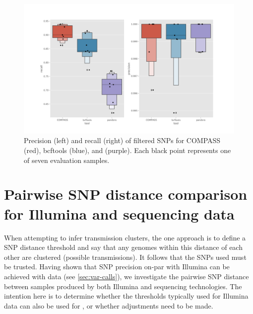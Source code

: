 \begin{figure}
\begin{center}
\includegraphics[width=0.9\columnwidth]{Chapter2/Figs/combined-precision-recall-filters-snps.png}
\caption{{Precision (left) and recall (right) of filtered SNPs for COMPASS (red), bcftools (blue), and \pandora{} (purple). Each black point represents one of seven evaluation samples. 
{\label{fig:prec-recall-filters}}%
}}
\end{center}
\end{figure}


\section{Pairwise SNP distance comparison for Illumina and \ont{} sequencing data}
\label{sec:snp-dist}

When attempting to infer transmission clusters, the one approach is
to define a SNP distance threshold and say that any genomes within this
distance of each other are clustered (possible transmissions). It follows that the SNPs used must
be trusted. Having shown that SNP precision on-par with Illumina can be
achieved with \ont{} data (see \autoref{sec:var-calls}), we investigate the pairwise SNP distance
between samples produced by both Illumina and \ont{} sequencing technologies. The intention
here is to determine whether the thresholds typically used for Illumina
data can also be used for \ont{}, or whether adjustments need to be
made.

